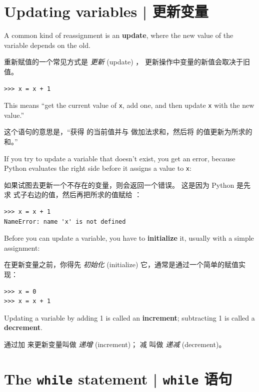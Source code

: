 \section{Updating variables  |  更新变量}
\label{update}

  
  

A common kind of reassignment is an {\bf update},
where the new value of the variable depends on the old.

重新赋值的一个常见方式是 {\em 更新} (update) ， 更新操作中变量的新值会取决于旧值。


\begin{lstlisting}
>>> x = x + 1
\end{lstlisting}

%
This means ``get the current value of {\tt x}, add one, and then
update {\tt x} with the new value.''

这个语句的意思是，``获得  的当前值并与  做加法求和，然后将  的值更新为所求的和。''

If you try to update a variable that doesn't exist, you get an
error, because Python evaluates the right side before it assigns
a value to {\tt x}:

如果试图去更新一个不存在的变量，则会返回一个错误。 这是因为 Python 是先求
式子右边的值，然后再把所求的值赋给 ：

\begin{lstlisting}
>>> x = x + 1
NameError: name 'x' is not defined
\end{lstlisting}

%
Before you can update a variable, you have to {\bf initialize}
it, usually with a simple assignment:

在更新变量之前，你得先 {\em 初始化} (initialize) 它，通常是通过一个简单的赋值实现：

\begin{lstlisting}
>>> x = 0
>>> x = x + 1
\end{lstlisting}

%
Updating a variable by adding 1 is called an {\bf increment};
subtracting 1 is called a {\bf decrement}.
  

通过加  来更新变量叫做 {\em 递增} (increment)； 减  叫做 {\em 递减} (decrement)。
  


\section{The {\tt while} statement  |  {\tt while} 语句}
  
  

